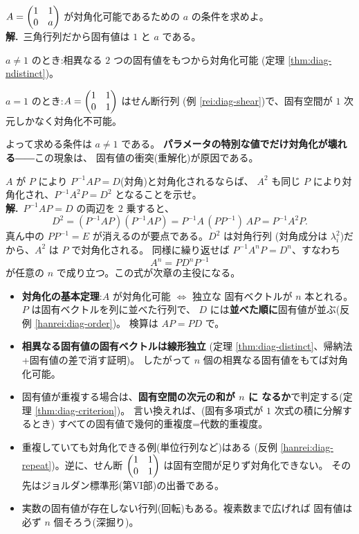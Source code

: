 \begin{rei}[例題・標準(パラメータつきの判定)]\label{rei:diag-param}
$A = \begin{pmatrix}1 & 1 \\ 0 & a\end{pmatrix}$ が対角化可能であるための
$a$ の条件を求めよ。\\
\textbf{解.}\ 三角行列だから固有値は $1$ と $a$ である。

$a \neq 1$ のとき:相異なる $2$ つの固有値をもつから対角化可能
(定理 \ref{thm:diag-ndistinct})。

$a = 1$ のとき:$A = \begin{pmatrix}1 & 1 \\ 0 & 1\end{pmatrix}$ はせん断行列
(例 \ref{rei:diag-shear})で、固有空間が $1$ 次元しかなく対角化不可能。

よって求める条件は $a \neq 1$ である。
\textbf{パラメータの特別な値でだけ対角化が壊れる}――この現象は、
固有値の衝突(重解化)が原因である。
\end{rei}

\begin{rei}[例題・標準(証明:べきの対角化)]\label{rei:diag-power}
$A$ が $P$ により $P^{-1}AP = D$(対角)と対角化されるならば、
$A^2$ も同じ $P$ により対角化され、$P^{-1}A^2P = D^2$ となることを示せ。\\
\textbf{解.}\ $P^{-1}AP = D$ の両辺を $2$ 乗すると、
\[
D^2 = (P^{-1}AP)(P^{-1}AP) = P^{-1}A\,(PP^{-1})\,AP = P^{-1}A^2P.
\]
真ん中の $PP^{-1} = E$ が消えるのが要点である。$D^2$ は対角行列
(対角成分は $\lambda_i^2$)だから、$A^2$ は $P$ で対角化される。
同様に繰り返せば $P^{-1}A^nP = D^n$、すなわち
\[
A^n = P D^n P^{-1}
\]
が任意の $n$ で成り立つ。この式が次章の主役になる。
\end{rei}

\begin{matome}
\begin{itemize}
\item \textbf{対角化の基本定理}:$A$ が対角化可能 $\iff$ 独立な
固有ベクトルが $n$ 本とれる。$P$ は固有ベクトルを列に並べた行列で、
$D$ には\textbf{並べた順に}固有値が並ぶ(反例 \ref{hanrei:diag-order})。
検算は $AP = PD$ で。
\item \textbf{相異なる固有値の固有ベクトルは線形独立}
(定理 \ref{thm:diag-distinct}、帰納法+固有値の差で消す証明)。
したがって $n$ 個の相異なる固有値をもてば対角化可能。
\item 固有値が重複する場合は、\textbf{固有空間の次元の和が $n$ に
なるか}で判定する(定理 \ref{thm:diag-criterion})。
言い換えれば、(固有多項式が $1$ 次式の積に分解するとき)
すべての固有値で幾何的重複度=代数的重複度。
\item 重複していても対角化できる例(単位行列など)はある
(反例 \ref{hanrei:diag-repeat})。逆に、せん断
$\begin{pmatrix}1 & 1 \\ 0 & 1\end{pmatrix}$ は固有空間が足りず対角化できない。
その先はジョルダン標準形(第VI部)の出番である。
\item 実数の固有値が存在しない行列(回転)もある。複素数まで広げれば
固有値は必ず $n$ 個そろう(深掘り)。
\end{itemize}
\end{matome}

